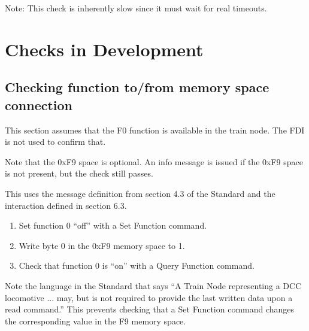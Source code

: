 Note: This check is inherently slow since it must wait for real timeouts.


\section {Checks in Development}

\subsection{Checking function to/from memory space connection}

This section assumes that the F0 function is available in the train node.
The FDI is not used to confirm that.

Note that the 0xF9 space is optional.  An info message is issued if the 0xF9 space
is not present, but the check still passes.

This uses the message definition from section 4.3 of the Standard
and the interaction defined in section 6.3.

\begin{enumerate}

    \item Set function 0 ``off'' with a Set Function command.

    \item Write byte 0 in the 0xF9 memory space to 1.

    \item Check that function 0 is ``on'' with a Query Function command.

\end{enumerate}

Note the language in the Standard that says
``A Train Node representing a DCC locomotive ... may,
but is not required to provide the last written data upon a read command.''
This prevents checking that a Set Function command changes the corresponding
value in the F9 memory space.


  
